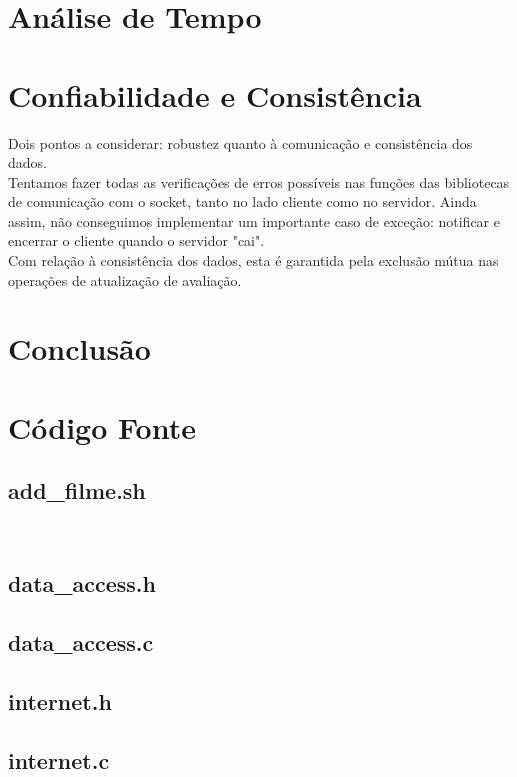\documentclass[11pt,twoside]{article}
\begin{document}
\section{Análise de Tempo}

\section{Confiabilidade e Consistência}
Dois pontos a considerar: robustez quanto à comunicação e consistência dos dados.\\
Tentamos fazer todas as verificações de erros possíveis nas funções das bibliotecas de comunicação com o socket, tanto no lado cliente como no servidor. Ainda assim, não conseguimos implementar um importante caso de exceção: notificar e encerrar o cliente quando o servidor "cai".\\
Com relação à consistência dos dados, esta é garantida pela exclusão mútua nas operações de atualização de avaliação.

\section{Conclusão}


\section{Código Fonte}
\subsection{add\_filme.sh}  %
\begin{codelisting}
\begin{verbatim}


\end{verbatim}
\end{codelisting}

\subsection{data\_access.h} %
\subsection{data\_access.c} %
\subsection{internet.h}     %
\subsection{internet.c}     %
\end{document}
